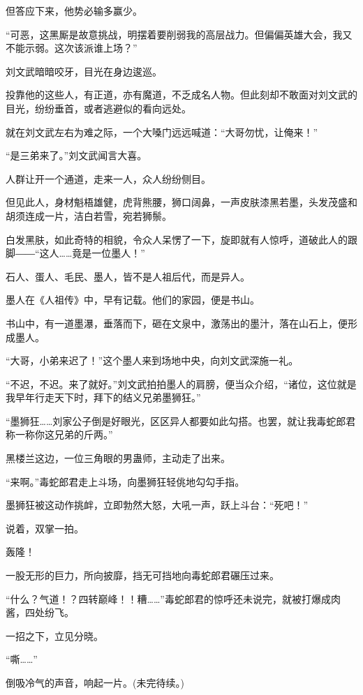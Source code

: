 \begin{this_body}
但答应下来，他势必输多赢少。

“可恶，这黑厮是故意挑战，明摆着要削弱我的高层战力。但偏偏英雄大会，我又不能示弱。这次该派谁上场？”

刘文武暗暗咬牙，目光在身边逡巡。

投靠他的这些人，有正道，亦有魔道，不乏成名人物。但此刻却不敢面对刘文武的目光，纷纷垂首，或者逃避似的看向远处。

就在刘文武左右为难之际，一个大嗓门远远喊道：“大哥勿忧，让俺来！”

“是三弟来了。”刘文武闻言大喜。

人群让开一个通道，走来一人，众人纷纷侧目。

但见此人，身材魁梧雄健，虎背熊腰，狮口阔鼻，一声皮肤漆黑若墨，头发茂盛和胡须连成一片，洁白若雪，宛若狮鬃。

白发黑肤，如此奇特的相貌，令众人呆愣了一下，旋即就有人惊呼，道破此人的跟脚――“这人……竟是一位墨人！”

石人、蛋人、毛民、墨人，皆不是人祖后代，而是异人。

墨人在《人祖传》中，早有记载。他们的家园，便是书山。

书山中，有一道墨瀑，垂落而下，砸在文泉中，激荡出的墨汁，落在山石上，便形成墨人。

“大哥，小弟来迟了！”这个墨人来到场地中央，向刘文武深施一礼。

“不迟，不迟。来了就好。”刘文武拍拍墨人的肩膀，便当众介绍，“诸位，这位就是我早年行走天下时，拜下的结义兄弟墨狮狂。”

“墨狮狂……刘家公子倒是好眼光，区区异人都要如此勾搭。也罢，就让我毒蛇郎君称一称你这兄弟的斤两。”

黑楼兰这边，一位三角眼的男蛊师，主动走了出来。

“来啊。”毒蛇郎君走上斗场，向墨狮狂轻佻地勾勾手指。

墨狮狂被这动作挑衅，立即勃然大怒，大吼一声，跃上斗台：“死吧！”

说着，双掌一拍。

轰隆！

一股无形的巨力，所向披靡，挡无可挡地向毒蛇郎君碾压过来。

“什么？气道！？四转巅峰！！糟……”毒蛇郎君的惊呼还未说完，就被打爆成肉酱，四处纷飞。

一招之下，立见分晓。

“嘶……”

倒吸冷气的声音，响起一片。(未完待续。)

\end{this_body}

